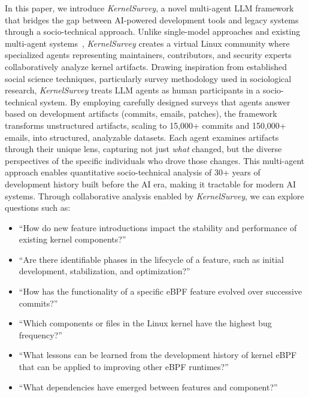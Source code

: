 \documentclass[sigconf,review,anonymous]{acmart}
\newcommand{\sys}{\textit{KernelSurvey}\xspace}
\begin{document}
In this paper, we introduce \sys, a novel multi-agent LLM framework that bridges the gap between AI-powered development tools and legacy systems through a socio-technical approach. Unlike single-model approaches and existing multi-agent systems~\cite{lmase2024,agent4se2024}, \sys creates a virtual Linux community where specialized agents representing maintainers, contributors, and security experts collaboratively analyze kernel artifacts. Drawing inspiration from established social science techniques, particularly survey methodology used in sociological research, \sys treats LLM agents as human participants in a socio-technical system. By employing carefully designed surveys that agents answer based on development artifacts (commits, emails, patches)\cite{linux,tan2019communicate,schneider2016differentiating}, the framework transforms unstructured artifacts, scaling to 15,000+ commits and 150,000+ emails, into structured, analyzable datasets. Each agent examines artifacts through their unique lens, capturing not just \emph{what} changed, but the diverse perspectives of the specific individuals who drove those changes. This multi-agent approach enables quantitative socio-technical analysis of 30+ years of development history built before the AI era, making it tractable for modern AI systems. Through collaborative analysis enabled by \sys, we can explore questions such as:


\begin{itemize}
    \item ``How do new feature introductions impact the stability and performance of existing kernel components?''
    \item ``Are there identifiable phases in the lifecycle of a feature, such as initial development, stabilization, and optimization?''
    \item ``How has the functionality of a specific eBPF feature evolved over successive commits?''
    \item ``Which components or files in the Linux kernel have the highest bug frequency?''
    \item ``What lessons can be learned from the development history of kernel eBPF that can be applied to improving other eBPF runtimes?''
    \item ``What dependencies have emerged between features and component?''
\end{itemize}
\end{document}
